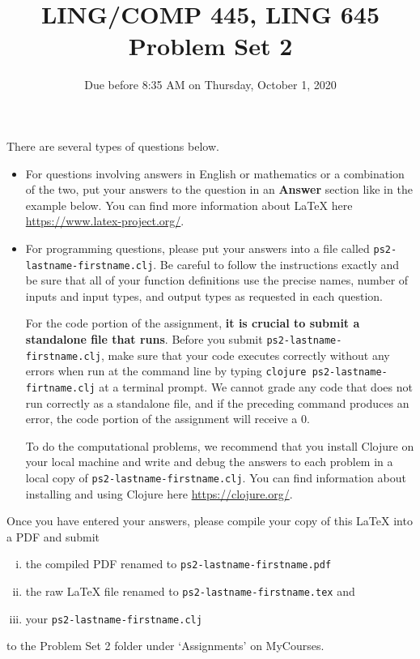\documentclass[10pt]{article}
\newcommand{\PSnum}{2}
\begin{document}
 
\title{LING/COMP 445, LING 645\\Problem Set \PSnum}
\date{Due before 8:35 AM on Thursday, October 1, 2020}
\maketitle
There are several types of questions below. 
\begin{itemize}
\item
For questions involving answers in English or mathematics or a
combination of the two, put your answers to the question in an
\textbf{Answer} section like in the example below. You can find more
information about \LaTeX{} here \url{https://www.latex-project.org/}.

\item For programming questions,
please put your answers into a file called
\texttt{ps\PSnum-lastname-firstname.clj}. Be careful to follow the instructions
exactly and be sure that all of your function definitions use the
precise names, number of inputs and input types, and output types as
requested in each question.

For the code portion of the assignment, \textbf{it is crucial to submit a
standalone file that runs}. Before you submit \texttt{ps\PSnum-lastname-firstname.clj}, 
make sure that your code executes correctly without any errors 
when run at the command line by typing 
\texttt{clojure ps\PSnum-lastname-firtname.clj} at a terminal
prompt. We cannot grade any code that does not run correctly as a
standalone file, and if the preceding command produces an error,
the code portion of the assignment will receive a $0$.

To do the computational problems, we recommend that you install
Clojure on your local machine and write and debug the answers to each
problem in a local copy of \texttt{ps\PSnum-lastname-firstname.clj}. You can
find information about installing and using Clojure here
\url{https://clojure.org/}.
\end{itemize}
Once you have entered your answers, please compile your copy of this
\LaTeX{} into a PDF and submit 
\begin{enumerate}[(i),noitemsep]
\item
the compiled PDF renamed to
\texttt{ps\PSnum-lastname-firstname.pdf} 
\item
the raw \LaTeX{} file renamed to
\texttt{ps\PSnum-lastname-firstname.tex} and 
\item
your \texttt{ps\PSnum-lastname-firstname.clj}
\end{enumerate}
to the Problem Set \PSnum{} folder under `Assignments' on MyCourses.
\end{document}
